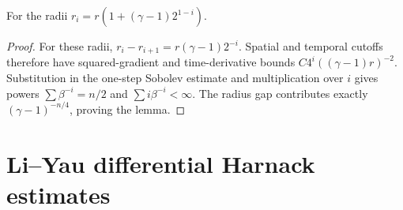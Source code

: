 \begin{example}
\label{ex:chow-iii-rescaled-moser-cylinder-iteration}


For the radii
\(r_i=r(1+(\gamma-1)2^{1-i})\).
\end{example}
\begin{proof}
\sketch For these radii,
\(r_i-r_{i+1}=r(\gamma-1)2^{-i}\).  Spatial and temporal cutoffs therefore
have squared-gradient and time-derivative bounds
\(C4^i((\gamma-1)r)^{-2}\).  Substitution in the one-step Sobolev estimate
and multiplication over \(i\) gives powers
\(\sum\beta^{-i}=n/2\) and \(\sum i\beta^{-i}<\infty\).  The radius gap
contributes exactly \((\gamma-1)^{-n/4}\), proving the lemma.
\end{proof}

\section{Li--Yau differential Harnack estimates}


